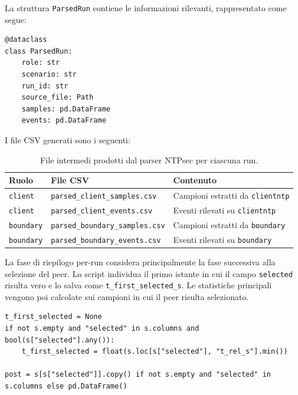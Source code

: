 La struttura \texttt{ParsedRun} contiene le informazioni rilevanti, rappresentato come segue:

\begin{listing}[H]
\begin{verbatim}
@dataclass
class ParsedRun:
    role: str
    scenario: str
    run_id: str
    source_file: Path
    samples: pd.DataFrame
    events: pd.DataFrame
\end{verbatim}
\caption{Struttura dati utilizzata per rappresentare una run NTPsec parsata.}
\label{lst:ntpsec-parsedrun}
\end{listing}

I file CSV generati sono i seguenti:

\begin{table}[H]
  \centering
  \begin{tabular}{lll}
    \hline
    \textbf{Ruolo} & \textbf{File CSV} & \textbf{Contenuto} \\
    \hline
    \texttt{client} & \texttt{parsed\_client\_samples.csv} & Campioni estratti da \texttt{clientntp} \\
    \texttt{client} & \texttt{parsed\_client\_events.csv} & Eventi rilevati su \texttt{clientntp} \\
    \texttt{boundary} & \texttt{parsed\_boundary\_samples.csv} & Campioni estratti da \texttt{boundary} \\
    \texttt{boundary} & \texttt{parsed\_boundary\_events.csv} & Eventi rilevati su \texttt{boundary} \\
    \hline
  \end{tabular}
  \caption{File intermedi prodotti dal parser NTPsec per ciascuna run.}
  \label{tab:ntpsec-csv-per-run}
\end{table}

La fase di riepilogo per-run considera principalmente la fase successiva alla
selezione del peer. Lo script individua il primo istante in cui il campo
\texttt{selected} risulta vero e lo salva come
\texttt{t\_first\_selected\_s}. Le statistiche principali vengono poi calcolate
sui campioni in cui il peer risulta selezionato.

\begin{listing}[H]
\begin{verbatim}
t_first_selected = None
if not s.empty and "selected" in s.columns and bool(s["selected"].any()):
    t_first_selected = float(s.loc[s["selected"], "t_rel_s"].min())

post = s[s["selected"]].copy() if not s.empty and "selected" in s.columns else pd.DataFrame()
\end{verbatim}
\caption{Identificazione della prima selezione del peer e dei campioni post-selezione.}
\label{lst:ntpsec-post-selection}
\end{listing}

